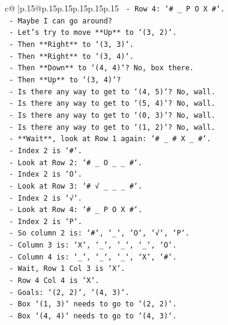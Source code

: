 \documentclass{article}
\begin{document}
{\begin{supertabular}{c@{$\;$}|p{.15\linewidth}@{}p{.15\linewidth}p{.15\linewidth}p{.15\linewidth}p{.15\linewidth}p{.15\linewidth}}
{{{\texttt{          {-} Row 4: `\# \_ P O X \#`.} \\
\texttt{          {-} Maybe I can go around?} \\
\texttt{          {-} Let's try to move **Up** to `(3, 2)`.} \\
\texttt{          {-} Then **Right** to `(3, 3)`.} \\
\texttt{          {-} Then **Right** to `(3, 4)`.} \\
\texttt{          {-} Then **Down** to `(4, 4)`? No, box there.} \\
\texttt{          {-} Then **Up** to `(3, 4)`?} \\
\texttt{          {-} Is there any way to get to `(4, 5)`? No, wall.} \\
\texttt{          {-} Is there any way to get to `(5, 4)`? No, wall.} \\
\texttt{          {-} Is there any way to get to `(0, 3)`? No, wall.} \\
\texttt{          {-} Is there any way to get to `(1, 2)`? No, wall.} \\
\texttt{          {-} **Wait**, look at Row 1 again: `\# \_ \# X \_ \#`.} \\
\texttt{          {-} Index 2 is `\#`.} \\
\texttt{          {-} Look at Row 2: `\# \_ O \_ \_ \#`.} \\
\texttt{          {-} Index 2 is `O`.} \\
\texttt{          {-} Look at Row 3: `\# √ \_ \_ \_ \#`.} \\
\texttt{          {-} Index 2 is `√`.} \\
\texttt{          {-} Look at Row 4: `\# \_ P O X \#`.} \\
\texttt{          {-} Index 2 is `P`.} \\
\texttt{          {-} So column 2 is: `\#`, `\_`, `O`, `√`, `P`.} \\
\texttt{          {-} Column 3 is: `X`, `\_`, `\_`, `\_`, `O`.} \\
\texttt{          {-} Column 4 is: `\_`, `\_`, `\_`, `X`, `\#`.} \\
\texttt{          {-} Wait, Row 1 Col 3 is `X`.} \\
\texttt{          {-} Row 4 Col 4 is `X`.} \\
\texttt{          {-} Goals: `(2, 2)`, `(4, 3)`.} \\
\texttt{          {-} Box `(1, 3)` needs to go to `(2, 2)`.} \\
\texttt{          {-} Box `(4, 4)` needs to go to `(4, 3)`.} \\
}}}
\end{supertabular}}
\end{document}
